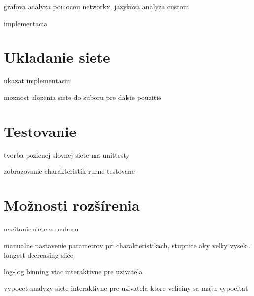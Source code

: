 grafova analyza pomocou networkx, jazykova analyza custom

implementacia

\section{Ukladanie siete}\label{sec:ukladanieSiete}

ukazat implementaciu

moznost ulozenia siete do suboru pre dalsie pouzitie

\section{Testovanie}\label{sec:testovanie}

tvorba pozicnej slovnej siete ma unittesty

zobrazovanie charakteristik rucne testovane

\section{Možnosti rozšírenia}\label{sec:možnostiRozšírenia}

nacitanie siete zo suboru

manualne nastavenie parametrov pri charakteristikach, stupnice aky velky vysek..
longest decreasing slice

log-log binning viac interaktivne pre uzivatela

vypocet analyzy siete interaktivne pre uzivatela ktore veliciny sa maju vypocitat